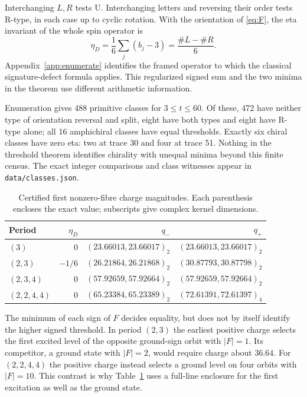 Interchanging \(L,R\) tests U. Interchanging letters and reversing their order tests R-type, in each case up to cyclic rotation. With the orientation of \eqref{eq:F}, the eta invariant of the whole spin operator is
\begin{equation}
 \eta_D=\frac16\sum_j(b_j-3)=\frac{\#L-\#R}{6}.
 \label{eq:sol-eta}
\end{equation}
Appendix~\ref{app:enumerate} identifies the framed operator to which the classical signature-defect formula applies. This regularized signed sum and the two minima in the theorem use different arithmetic information.

Enumeration gives 488 primitive classes for \(3\le t\le60\). Of these, 472 have neither type of orientation reversal and split, eight have both types and eight have R-type alone; all 16 amphichiral classes have equal thresholds. Exactly six chiral classes have zero eta: two at trace 30 and four at trace 51. Nothing in the threshold theorem identifies chirality with unequal minima beyond this finite census. The exact integer comparisons and class witnesses appear in \texttt{data/classes.json}.

\begin{table}[htbp]\centering\small
\caption{Certified first nonzero-fibre charge magnitudes. Each parenthesis encloses the exact value; subscripts give complex kernel dimensions.}\label{tab:sol}
\begin{tabular}{@{}lrrr@{}}\toprule
Period & \(\eta_D\)& \(q_-\)& \(q_+\)\\\midrule
\((3)\)&0& \((23.66013,23.66017)_2\)& \((23.66013,23.66017)_2\)\\
\((2,3)\)&\(-1/6\)&\((26.21864,26.21868)_2\)&\((30.87793,30.87798)_2\)\\
\((2,3,4)\)&0&\((57.92659,57.92664)_2\)&\((57.92659,57.92664)_2\)\\
\((2,2,4,4)\)&0&\((65.23384,65.23389)_2\)&\((72.61391,72.61397)_4\)\\\bottomrule
\end{tabular}
\end{table}
The minimum of each sign of \(F\) decides equality, but does not by itself identify the higher signed threshold. In period \((2,3)\) the earliest positive charge selects the first excited level of the opposite ground-sign orbit with \(|F|=1\). Its competitor, a ground state with \(|F|=2\), would require charge about \(36.64\). For \((2,2,4,4)\) the positive charge instead selects a ground level on four orbits with \(|F|=10\). This contrast is why Table~\ref{tab:sol} uses a full-line enclosure for the first excitation as well as the ground state.
